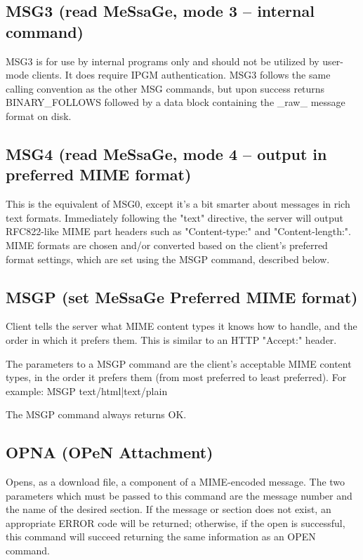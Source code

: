 \subsection{MSG3 (read MeSsaGe, mode 3 -- internal command)}

 MSG3 is for use by internal programs only and should not be utilized by
user-mode clients.  It does require IPGM authentication.  MSG3 follows the
same calling convention as the other MSG commands, but upon success returns
BINARY_FOLLOWS followed by a data block containing the _raw_ message format
on disk.



\subsection{MSG4 (read MeSsaGe, mode 4 -- output in preferred MIME format)}

 This is the equivalent of MSG0, except it's a bit smarter about messages in
rich text formats.  Immediately following the "text" directive, the server
will output RFC822-like MIME part headers such as "Content-type:" and
"Content-length:".  MIME formats are chosen and/or converted based on the
client's preferred format settings, which are set using the MSGP command,
described below.



\subsection{MSGP (set MeSsaGe Preferred MIME format)}

 Client tells the server what MIME content types it knows how to handle, and
the order in which it prefers them.  This is similar to an HTTP "Accept:"
header.

 The parameters to a MSGP command are the client's acceptable MIME content
types, in the order it prefers them (from most preferred to least preferred).
For example:  MSGP text/html|text/plain

 The MSGP command always returns OK.



\subsection{OPNA (OPeN Attachment)}

 Opens, as a download file, a component of a MIME-encoded message.  The two
parameters which must be passed to this command are the message number and the
name of the desired section.  If the message or section does not exist, an
appropriate ERROR code will be returned; otherwise, if the open is successful,
this command will succeed returning the same information as an OPEN command.



